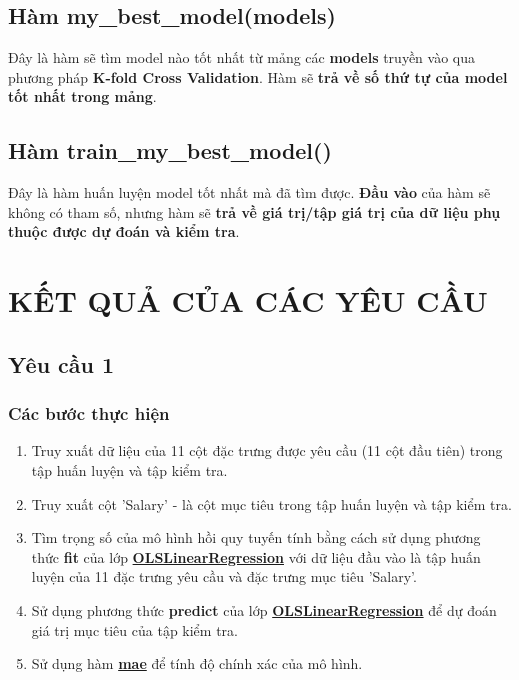 \documentclass{report}
\begin{document}
\subsection{Hàm my\_best\_model(models)}
    Đây là hàm sẽ tìm model nào tốt nhất từ mảng các \textbf{models} truyền vào qua phương pháp \textbf{K-fold Cross Validation}. Hàm sẽ \textbf{trả về số thứ tự của model tốt nhất trong mảng}.

\subsection{Hàm train\_my\_best\_model()}
    Đây là hàm huấn luyện model tốt nhất mà đã tìm được. \textbf{Đầu vào} của  hàm sẽ không có tham số, nhưng hàm sẽ \textbf{trả về giá trị/tập giá trị của dữ liệu phụ thuộc được dự đoán và kiểm tra}.

\section{KẾT QUẢ CỦA CÁC YÊU CẦU}
    \subsection{Yêu cầu 1}
        \subsubsection{Các bước thực hiện}
            \begin{enumerate}
                \item Truy xuất dữ liệu của 11 cột đặc trưng được yêu cầu (11 cột đầu tiên) trong tập huấn luyện và tập kiểm tra.
                \item Truy xuất cột 'Salary' - là cột mục tiêu trong tập huấn luyện và tập kiểm tra.
                \item Tìm trọng số của mô hình hồi quy tuyến tính bằng cách sử dụng phương thức \textbf{fit} của lớp \hyperref[sec:olslinearregression]{\textbf{OLSLinearRegression}} với dữ liệu đầu vào là tập huấn luyện của 11 đặc trưng yêu cầu và đặc trưng mục tiêu 'Salary'.
                \item Sử dụng phương thức \textbf{predict} của lớp \hyperref[sec:olslinearregression]{\textbf{OLSLinearRegression}} để dự đoán giá trị mục tiêu của tập kiểm tra.
                \item Sử dụng hàm \hyperref[sec:mae]{\textbf{mae}}  để tính độ chính xác của mô hình.
            \end{enumerate}
\end{document}
